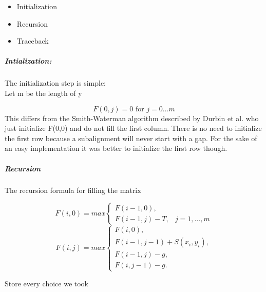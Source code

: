 \begin{itemize}
	\item Initialization
	\item Recursion
	\item Traceback
\end{itemize}

\subparagraph{Intialization:}
	The initialization step is simple: \\
	Let m be the length of y
	
	\begin{equation*}
		F(0,j) = 0 \text{ for } j=0\dotsc m
	\end{equation*}
	This differs from the Smith-Waterman algorithm described by Durbin et al.\cite{durbin1998} who just initialize F(0,0) and do not fill the first column. There is no need to initialize the first row because a subalignment will never start with a gap. For the sake of an easy implementation it was better to initialize the first row though.

\subparagraph{Recursion}
	The recursion formula for filling the matrix

\begin{equation}
F(i,0) = max \left\{ \begin{array}{lr}F(i-1,0),&\\F(i-1,j)-T,& j=1,\dots,m\end{array}\right. 
\end{equation}
\begin{equation}
F(i,j) = max \left\{ \begin{array}{lr}F(i,0),\\F(i-1,j-1)+S(x_i,y_i),\\F(i-1,j)-g,\\F(i,j-1)-g.\end{array}\right.
\end{equation}
		
		Store every choice we took

